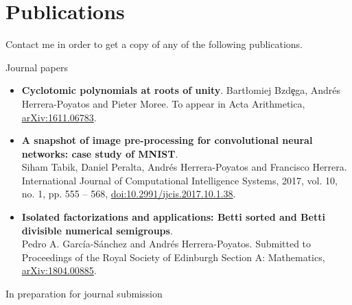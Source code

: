 \documentclass[10pt,a4paper,sans]{moderncv} %
\begin{document}

\section{Publications}

Contact me in order to get a copy of any of the following publications.

{\large \textcolor{color1}{Journal papers}}

	\begin{itemize}
        \item \textbf{Cyclotomic polynomials at roots of unity}. Bart{\l}omiej Bzd\c{e}ga, Andrés Herrera-Poyatos and Pieter Moree. %
              To appear in Acta Arithmetica, \textcolor{colorl}{\href{https://arxiv.org/abs/1611.06783}{arXiv:1611.06783}}.
	\item \textbf{A snapshot of image pre-processing for convolutional neural networks: case study of MNIST}. \\ Siham Tabik, Daniel Peralta, Andrés Herrera-Poyatos and Francisco Herrera. International Journal of Computational Intelligence Systems, 2017, vol. 10, no. 1, pp. 555 -- 568, \textcolor{colorl}{\href{http://www.atlantis-press.com/journals/ijcis/25867315}{doi:10.2991/ijcis.2017.10.1.38}}.
	\item \textbf{Isolated factorizations and applications: Betti sorted and Betti divisible numerical semigroups}. \\ Pedro A. Garc\'ia-S\'anchez and Andr\'es Herrera-Poyatos. Submitted to Proceedings of the Royal Society of Edinburgh Section A: Mathematics, \textcolor{colorl}{\href{https://arxiv.org/abs/1804.00885}{arXiv:1804.00885}}.
	\end{itemize}
                          
{\large \textcolor{color1}{In preparation for journal submission}}
\end{document}

